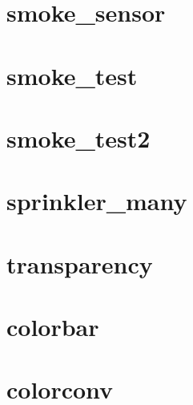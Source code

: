 \documentclass[11pt,twoside]{book}
\newcommand{\fdsinput}[1]{
{
\scriptsize

}
}
\begin{document}
\section{smoke\_sensor}
\label{SSFsmokesensor}
\fdsinput{smoke_sensor.ssf}

\section{smoke\_test}
\label{SSFsmoketest}
\fdsinput{smoke_test.ssf}

\section{smoke\_test2}
\label{SSFsmoketest2}
\fdsinput{smoke_test2.ssf}

\section{sprinkler\_many}
\label{SSFspinklermany}
\fdsinput{sprinkler_many.ssf}

\section{transparency}
\label{SSFtransparency}
\fdsinput{transparency.ssf}

\section{colorbar}
\label{SSFcolorbar}
\fdsinput{colorbar.ssf}

\section{colorconv}
\label{SSFcolorconv}
\fdsinput{colorconv.ssf}
\end{document}
